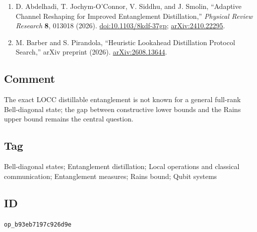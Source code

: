 \begin{enumerate}[label={},leftmargin=4.8em,labelsep=0.5em]
  \item[\textup{[AJSS26]}]\label{ref:p3-abdelhadi}
  D. Abdelhadi, T. Jochym-O'Connor, V. Siddhu, and J. Smolin, ``Adaptive
  Channel Reshaping for Improved Entanglement Distillation,''
  \emph{Physical Review Research} \textbf{8}, 013018 (2026).
  \href{https://doi.org/10.1103/8kdf-37gp}{doi:10.1103/8kdf-37gp};
  \href{https://arxiv.org/abs/2410.22295}{arXiv:2410.22295}.

  \item[\textup{[BP26]}]\label{ref:p3-barber-pirandola}
  M. Barber and S. Pirandola,
  ``Heuristic Lookahead Distillation Protocol Search,'' arXiv preprint (2026).
  \href{https://arxiv.org/abs/2608.13644}{arXiv:2608.13644}.
\end{enumerate}

\subsection*{Comment}

The exact LOCC distillable entanglement is not known for a general full-rank
Bell-diagonal state; the gap between constructive lower bounds and the Rains
upper bound remains the central question.

\subsection*{Tag}

Bell-diagonal states; Entanglement distillation;
Local operations and classical communication; Entanglement measures;
Rains bound; Qubit systems

\subsection*{ID}

\texttt{op\_b93eb7197c926d9e}
